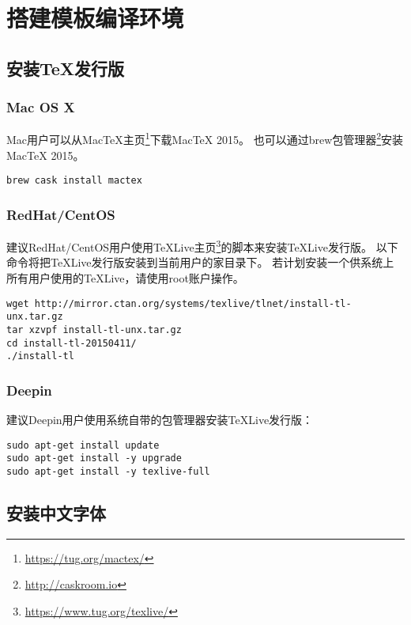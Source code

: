 \chapter{搭建模板编译环境}

\section{安装TeX发行版}

\subsection{Mac OS X}

Mac用户可以从MacTeX主页\footnote{\url{https://tug.org/mactex/}}下载MacTeX 2015。
也可以通过brew包管理器\footnote{\url{http://caskroom.io}}安装MacTeX 2015。

\begin{lstlisting}[basicstyle=\small\ttfamily, numbers=none]
brew cask install mactex
\end{lstlisting}

\subsection{RedHat/CentOS}

建议RedHat/CentOS用户使用TeXLive主页\footnote{\url{https://www.tug.org/texlive/}}的脚本来安装TeXLive发行版。
以下命令将把TeXLive发行版安装到当前用户的家目录下。
若计划安装一个供系统上所有用户使用的TeXLive，请使用root账户操作。

\begin{lstlisting}[basicstyle=\small\ttfamily, numbers=none]
wget http://mirror.ctan.org/systems/texlive/tlnet/install-tl-unx.tar.gz
tar xzvpf install-tl-unx.tar.gz
cd install-tl-20150411/
./install-tl
\end{lstlisting}

\subsection{Deepin}

建议Deepin用户使用系统自带的包管理器安装TeXLive发行版：

\begin{lstlisting}[basicstyle=\small\ttfamily, numbers=none]
sudo apt-get install update
sudo apt-get install -y upgrade
sudo apt-get install -y texlive-full
\end{lstlisting}

\section{安装中文字体}

